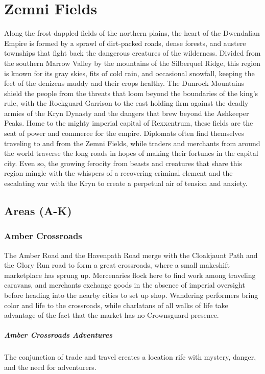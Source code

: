 \documentclass[10pt,a4paper,twoside,bg=print,twocolumn,openany,nodeprecatedcode]{dndbook}
\begin{document}
\section{Zemni Fields}
Along the frost-dappled fields of the northern plains, the heart of the Dwendalian Empire is formed by a sprawl of dirt-packed roads, dense forests, and austere townships that fight back the dangerous creatures of the wilderness. Divided from the southern Marrow Valley by the mountains of the Silberquel Ridge, this region is known for its gray skies, fits of cold rain, and occasional snowfall, keeping the feet of the denizens muddy and their crops healthy. The Dunrock Mountains shield the people from the threats that loom beyond the boundaries of the king's rule, with the Rockguard Garrison to the east holding firm against the deadly armies of the Kryn Dynasty and the dangers that brew beyond the Ashkeeper Peaks. Home to the mighty imperial capital of Rexxentrum, these fields are the seat of power and commerce for the empire. Diplomats often find themselves traveling to and from the Zemni Fields, while traders and merchants from around the world traverse the long roads in hopes of making their fortunes in the capital city. Even so, the growing ferocity from beasts and creatures that share this region mingle with the whispers of a recovering criminal element and the escalating war with the Kryn to create a perpetual air of tension and anxiety.

\subsection{Areas (A-K)}
\subsubsection{Amber Crossroads}
The Amber Road and the Havenpath Road merge with the Cloakjaunt Path and the Glory Run road to form a great crossroads, where a small makeshift marketplace has sprung up. Mercenaries flock here to find work among traveling caravans, and merchants exchange goods in the absence of imperial oversight before heading into the nearby cities to set up shop. Wandering performers bring color and life to the crossroads, while charlatans of all walks of life take advantage of the fact that the market has no Crownsguard presence.

\subparagraph{Amber Crossroads Adventures}
The conjunction of trade and travel creates a location rife with mystery, danger, and the need for adventurers.
\end{document}
